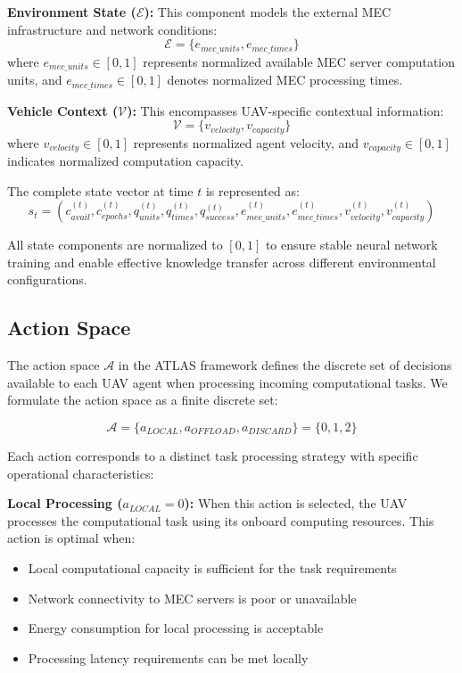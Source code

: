 \documentclass[journal]{IEEEtran}
\begin{document}
\textbf{Environment State ($\mathcal{E}$):} This component models the external MEC infrastructure and network conditions:
\begin{equation}
\mathcal{E} = \{e_{mec\_units}, e_{mec\_times}\}
\end{equation}
where $e_{mec\_units} \in [0, 1]$ represents normalized available MEC server computation units, and $e_{mec\_times} \in [0, 1]$ denotes normalized MEC processing times.

\textbf{Vehicle Context ($\mathcal{V}$):} This encompasses UAV-specific contextual information:
\begin{equation}
\mathcal{V} = \{v_{velocity}, v_{capacity}\}
\end{equation}
where $v_{velocity} \in [0, 1]$ represents normalized agent velocity, and $v_{capacity} \in [0, 1]$ indicates normalized computation capacity.

The complete state vector at time $t$ is represented as:
\begin{equation}
s_t = (c_{avail}^{(t)}, c_{epochs}^{(t)}, q_{units}^{(t)}, q_{times}^{(t)}, q_{success}^{(t)}, e_{mec\_units}^{(t)}, e_{mec\_times}^{(t)}, v_{velocity}^{(t)}, v_{capacity}^{(t)})
\end{equation}

All state components are normalized to $[0, 1]$ to ensure stable neural network training and enable effective knowledge transfer across different environmental configurations.

\subsection{Action Space}

The action space $\mathcal{A}$ in the ATLAS framework defines the discrete set of decisions available to each UAV agent when processing incoming computational tasks. We formulate the action space as a finite discrete set:

\begin{equation}
\mathcal{A} = \{a_{LOCAL}, a_{OFFLOAD}, a_{DISCARD}\} = \{0, 1, 2\}
\end{equation}

Each action corresponds to a distinct task processing strategy with specific operational characteristics:

\textbf{Local Processing ($a_{LOCAL} = 0$):} When this action is selected, the UAV processes the computational task using its onboard computing resources. This action is optimal when:
\begin{itemize}
\item Local computational capacity is sufficient for the task requirements
\item Network connectivity to MEC servers is poor or unavailable  
\item Energy consumption for local processing is acceptable
\item Processing latency requirements can be met locally
\end{itemize}
\end{document}
